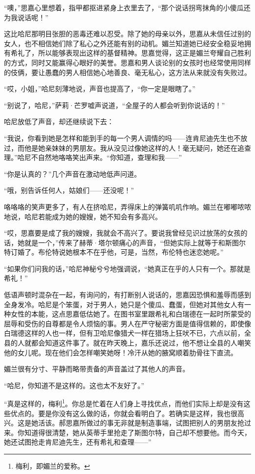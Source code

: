 \par “噢，”思嘉心里想着，指甲都抠进紧身上衣里去了，“那个说话拐弯抹角的小傻瓜还为我说话呢！”
\par 这比哈尼那明目张胆的恶毒还难以忍受。除了她的母亲以外，思嘉从未信任过别的女人，也不相信她们除了私心之外还能有别的动机。媚兰知道她已经安全稳妥地拥有希礼了，所以能够表现出这样的基督精神。思嘉觉得，这正是媚兰夸耀自己胜利的方式，同时又能赢得心眼好的美誉。思嘉和男人谈论别的女孩时也经常使用同样的伎俩，要让愚蠢的男人相信她心地善良、毫无私心，这方法从来就没有失败过。
\par “哎，小姐，”哈尼刻薄地说，声音也提高了，“你一定是眼瞎了。”
\par “别说了，哈尼，”萨莉·芒罗嘘声说道，“全屋子的人都会听到你说话的！”
\par 哈尼放低了声音，却还继续说下去：
\par “我说，你看到她是怎样和能到手的每一个男人调情的吗——连肯尼迪先生也不放过，而他是她亲妹妹的男朋友。我从没见过像她这样的人！毫无疑问，她还在追查理。”哈尼不自然地咯咯笑出声来。“你知道，查理和我——”
\par “你是认真的？”几个声音在激动地低声问道。
\par “哦，别告诉任何人，姑娘们——还没呢！”
\par 咯咯咯的笑声更多了，有人在挤哈尼，弄得床上的弹簧叽叽作响。媚兰在嘟嘟哝哝地说，哈尼若能成为她的嫂嫂，她不知会有多高兴。
\par “哎，思嘉要是成了我的嫂嫂，我就会不高兴了。要说我曾经见识过放荡的女孩的话，她就是一个，”传来了赫蒂·塔尔顿痛心的声音，“但她实际上就等于和斯图尔特订婚了。布伦特说她根本不在乎他，可是，当然，布伦特也迷恋她呢。”
\par “如果你们问我的话，”哈尼神秘兮兮地强调说，“她真正在乎的人只有一个。那就是希礼！”
\par 低语声顿时混杂在一起，有询问的，有打断别人说话的，思嘉因恐惧和羞辱而感到全身发冷。哈尼是个笨蛋，对于男人，她只是个傻瓜、蠢蛋，但她对其他女人有一种女性的本能，这点思嘉低估她了。在图书室里跟希礼和白瑞德在一起时所蒙受的屈辱和受伤的自尊都是令人烦恼的事。男人在严守秘密方面是值得信赖的，即使像白瑞德这样的人也一样，但有卫哈尼像猎犬一样在猎场上狂吠不已，六点以前，全县的人就都会知道这件事了。就在昨天晚上，嘉乐还说过，他不想让全县的人嘲笑他的女儿呢。现在他们会怎样嘲笑她呀！冷汗从她的腋窝顺着肋骨往下直流。
\par 媚兰很有分寸、平静而略带责备的声音盖过了其他人的声音。
\par “哈尼，你知道不是这样的。这也太不友好了。”
\par “真是这样的，梅利\footnote{梅利，即媚兰的爱称。}。你总是忙着在人们身上寻找优点，而他们实际上却是没有这些优点的。要是你没有这么做的话，你就会看明白了。若确实是这样，我也很高兴。这是她活该。郝思嘉所做过的事无非就是制造事端，试图把别人的男朋友抢过来。你知道得很清楚，她从英蒂手里抢走了斯图尔特，自己却不想要他。而今天，她还试图抢走肯尼迪先生，还有希礼和查理——”
